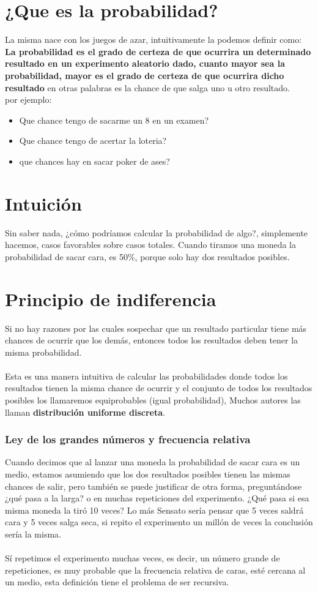\documentclass[12pt]{book}
\begin{document}
\section{¿Que es la probabilidad?}
La misma nace con los juegos de azar, intuitivamente la podemos definir como:
\textbf{La probabilidad es el grado de certeza de que ocurrira un determinado resultado en un experimento aleatorio dado, cuanto mayor sea la probabilidad, mayor es el grado de certeza de que ocurrira dicho resultado} en otras palabras es la chance de que salga uno u otro resultado.
\\
por ejemplo:
\begin{itemize}
\item Que chance tengo de sacarme un 8 en un examen?
\item Que chance tengo de acertar la loteria?
\item que chances hay en sacar poker de ases?
\end{itemize}
\section{Intuici\'on}
Sin saber nada, ¿cómo podríamos calcular la probabilidad de algo?, simplemente hacemos, casos favorables sobre casos totales. Cuando tiramos una moneda la probabilidad de sacar cara, es 50\%, porque solo hay dos resultados posibles.
\section{Principio de indiferencia}
Si no hay razones por las cuales sospechar que un resultado particular tiene más chances de ocurrir que los demás, entonces todos los resultados deben tener la misma probabilidad.
\\
\\
Esta es una manera intuitiva de calcular las probabilidades donde todos los resultados tienen la misma chance de ocurrir y el conjunto de todos los resultados posibles los llamaremos equiprobables (igual probabilidad), Muchos autores las llaman \textbf{distribución uniforme discreta}. 

\subsubsection{Ley de los grandes números y frecuencia relativa}
Cuando decimos que  al lanzar una moneda la probabilidad  de sacar cara es un medio, estamos asumiendo que los dos resultados posibles tienen las mismas chances de salir, pero también se puede justificar de otra forma, preguntándose ¿qué pasa a la larga? o en muchas repeticiones del experimento.
¿Qué pasa si esa misma moneda la tiró 10 veces?  Lo más Sensato sería pensar que 5 veces saldrá cara y 5 veces salga seca, si repito el experimento un millón de veces la conclusión sería la misma.
\\
\\
Sí repetimos el experimento muchas veces, es decir, un número grande de repeticiones, es muy probable que la frecuencia relativa de caras, esté cercana al un medio, esta definición tiene el problema de ser recursiva.
\end{document}
